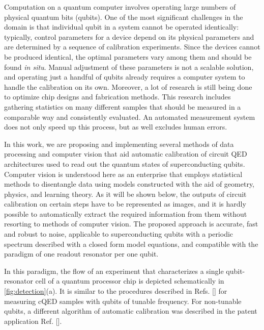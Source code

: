 \documentclass[%
 aip,
 draft,
 amsmath,amssymb,
 reprint,%
]{revtex4-1}
\begin{document}
Computation on a quantum computer involves operating large numbers of physical quantum bits (qubits). One of the most significant challenges in the domain is that individual qubit in a system cannot be operated identically:\cite{kelly2018, chen2018} typically, control parameters for a device depend on its physical parameters and are determined by a sequence of calibration experiments. Since the devices cannot be produced identical, the optimal parameters vary among them and should be found \textit{in situ}. Manual adjustment of these parameters is not a scalable solution, and operating just a handful of qubits already requires a computer system to handle the calibration on its own. Moreover, a lot of research is still being done to optimize chip designs and fabrication methods. This research includes gathering statistics on many different samples that should be measured in a comparable way and consistently evaluated. An automated measurement system does not only speed up this process, but as well excludes human errors.

In this work, we are proposing and implementing several methods of data processing and computer vision that aid automatic calibration of circuit QED\cite{blais2007} architectures used to read out the quantum states of superconducting qubits. Computer vision is understood here as an enterprise that employs statistical methods to disentangle data using models constructed with the aid of geometry, physics, and learning theory.\cite{forsyth2011} As it will be shown below, the outputs of circuit calibration on certain steps have to be represented as images, and it is hardly possible to automatically extract the required information from them without resorting to methods of computer vision. The proposed approach is accurate, fast and robust to noise, applicable to superconducting qubits with a periodic spectrum described with a closed form model equations, and compatible with the paradigm of one readout resonator per one qubit.\cite{versluis2017, kelly2015}

In this paradigm, the flow of an experiment that characterizes a single qubit-resonator cell of a quantum processor chip is depicted schematically in \autoref{fig:detection}(a). It is similar to the  procedures described in Refs. [] for measuring cQED samples with qubits of tunable frequency. For non-tunable qubits, a different algorithm of automatic calibration was described in the patent application Ref. []. 
\end{document}
